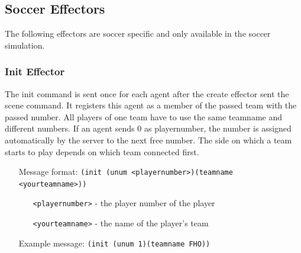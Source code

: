 \subsection{Soccer Effectors}
\label{sec:soccereffectors}
The following effectors are soccer specific and only available in the soccer
simulation.



\subsubsection{Init Effector}
\label{sec:initeffector}
The init command is sent once for each agent after the create effector sent the
scene command. It registers this agent as a member of the passed team with the passed number.
All players of one team have to use the same teamname and different numbers.
If an agent sends 0 as playernumber, the number is assigned automatically by
the server to the next free number.
The side on which a team starts to play depends on which team connected first.
\begin{itemize}
	\item[Message format:] \texttt{(init (unum <playernumber>)(teamname
	<yourteamname>))}
		\begin{itemize}
		  \item[\texttt{<playernumber>} -] the player number of the player
		  \item[\texttt{<yourteamname>} -] the name of the player's team
		\end{itemize}
	\item[Example message:] \texttt{(init (unum 1)(teamname FHO))}
\end{itemize}



